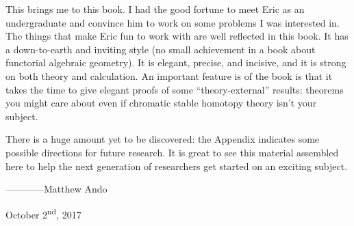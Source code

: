 This brings me to this book.  I had the good fortune to meet
Eric as an undergraduate and convince him to work on some problems I
was interested in. The things that make Eric fun to work with are
well reflected in this book.  It has a down-to-earth and inviting
style (no small achievement in a book about 
functorial algebraic geometry).  It is elegant,
precise, and incisive, and it is strong on both theory and
calculation.  An important feature is of the book is that it takes the
time to give elegant proofs of some ``theory-external'' results:
theorems you might care about even if chromatic stable homotopy theory isn't
your subject.  

There is a huge amount yet to be discovered: the Appendix indicates
some possible directions for future research.  It is great to see this
material assembled here to help the next generation of researchers get
started on an exciting subject.

\vspace{2\baselineskip}
\hspace{3em} ------------Matthew Ando

\hspace{7em} October 2\textsuperscript{nd}, 2017

